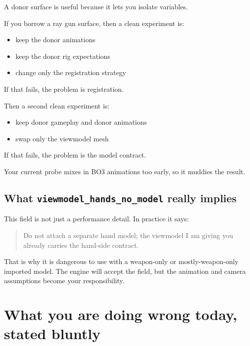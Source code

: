 \documentclass[11pt]{article}
\begin{document}
A donor surface is useful because it lets you isolate variables.

If you borrow a ray gun surface, then a clean experiment is:

\begin{itemize}
  \item keep the donor animations
  \item keep the donor rig expectations
  \item change only the registration strategy
\end{itemize}

If that fails, the problem is registration.

Then a second clean experiment is:

\begin{itemize}
  \item keep donor gameplay and donor animations
  \item swap only the viewmodel mesh
\end{itemize}

If that fails, the problem is the model contract.

Your current probe mixes in BO3 animations too early, so it muddies the result.

\subsection{What \texttt{viewmodel\_hands\_no\_model} really implies}

This field is not just a performance detail. In practice it says:

\begin{quote}
Do not attach a separate hand model; the viewmodel I am giving you already carries the hand-side contract.
\end{quote}

That is why it is dangerous to use  with a weapon-only or mostly-weapon-only imported model. The engine will accept the field, but the animation and camera assumptions become your responsibility.

\section{What you are doing wrong today, stated bluntly}
\end{document}
